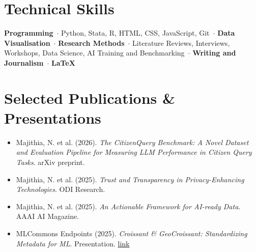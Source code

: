 \documentclass[a4paper,10pt]{article}
\newcommand{\ulinecustom}[1]{%
  \uline{\phantom{#1}}%
  \llap{\contour{white}{#1}}%
}
\def\and{\ifhmode\unskip\nobreak\fi\ $\cdot$ }
\begin{document}
\section*{Technical Skills}
\textbf{Programming}\and Python, Stata, R, HTML, CSS, JavaScript, Git\and\textbf{Data Visualisation}\and\textbf{Research Methods}\and Literature Reviews, Interviews, Workshops, Data Science, AI Training and Benchmarking\and\textbf{Writing and Journalism}\and\textbf{LaTeX}

\section*{Selected Publications \& Presentations}
\begin{itemize}
    \item Majithia, N. et al. (2026). \textit{The CitizenQuery Benchmark: A Novel Dataset and Evaluation Pipeline for Measuring LLM Performance in Citizen Query Tasks}. arXiv preprint. \href{https://www.google.com/search?q=https://doi.org/10.48550/arXiv.2602.04064}{\ulinecustom{[link]}}
    \item Majithia, N. et al. (2025). \textit{Trust and Transparency in Privacy-Enhancing Technologies}. ODI Research. \href{https://theodi.org/insights/reports/trust-and-transparency-in-privacy-enhancing-technologies/}{\ulinecustom{[link]}}
    \item Majithia, N. et al. (2025). \textit{An Actionable Framework for AI-ready Data}. AAAI AI Magazine. \href{https://onlinelibrary.wiley.com/doi/10.1002/aaai.70054}{\ulinecustom{[link]}}
    \item MLCommons Endpoints (2025). \textit{Croissant \& GeoCroissant: Standardizing Metadata for ML}. Presentation. \href{https://www.youtube.com/watch?v=hb_MN2-1Ui8}{link}
\end{itemize}
\end{document}
